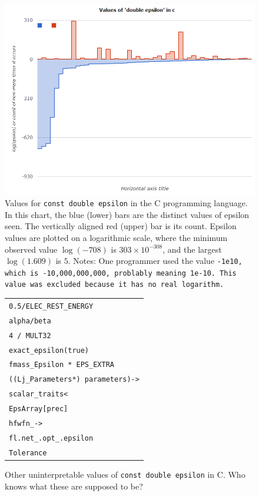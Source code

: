 \documentclass[twocolumn]{article}
\begin{document}
\begin{figure}[ht]
\begin{center}
\includegraphics[width=0.99 \linewidth]{chart-c-double}
\end{center}\vspace{-0.1in}
\caption{ Values for {\tt const double epsilon} in the C programming
  language. In this chart, the blue (lower) bars are the distinct values
  of epsilon seen. The vertically aligned red (upper) bar is its count.
  Epsilon values are plotted on a logarithmic scale, where the minimum
  observed value $\log(-708)$ is $303 \times 10^{-308}$, and the largest
  $\log(1.609)$ is $5$. 
  Notes: One programmer used the value \tt{-1e10}, which is
  -10,000,000,000, problably meaning \tt{1e-10}. This value was excluded
  because it has no real logarithm.
}
\label{fig:cdouble}
\end{figure}


\begin{figure}[ht]
\begin{center}
\begin{tabular}{l}
\verb+0.5/ELEC_REST_ENERGY+ \\
\verb+alpha/beta+ \\
\verb+4 / MULT32+ \\
\verb+exact_epsilon(true)+ \\
\verb+fmass_Epsilon * EPS_EXTRA+ \\
\verb+((Lj_Parameters*) parameters)->+ \\
\verb+scalar_traits<+ \\
\verb+EpsArray[prec]+ \\
\verb+hfwfn_->+ \\
\verb+fl.net_.opt_.epsilon+ \\
\verb+Tolerance+ \\
\end{tabular}
\end{center}\vspace{-0.1in}
\caption{ Other uninterpretable values of {\tt const double epsilon}
  in C. Who knows what these are supposed to be?}
\label{fig:cdoubleuninterpretable}
\end{figure}
\end{document}

